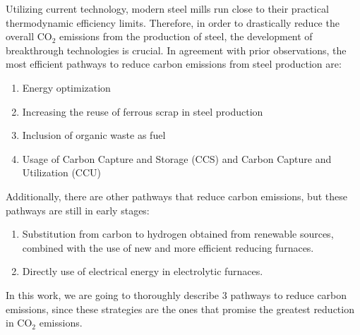 Utilizing current technology, modern steel mills run close to their practical thermodynamic efficiency limits. Therefore, in order to drastically reduce the overall CO$_2$ emissions from the production of steel, the development of breakthrough technologies is crucial.\autocite{rissman2020technologies} In agreement with prior observations,\autocite{aus_2022} the most efficient pathways to reduce carbon emissions from steel production are: 

\begin{enumerate}
\item Energy optimization
\item Increasing the reuse of ferrous scrap in steel production 
\item Inclusion of organic waste as fuel
\item Usage of Carbon Capture and Storage (CCS) and Carbon Capture and Utilization (CCU) 
\end{enumerate}

Additionally, there are other pathways that reduce carbon emissions, but these pathways are still in early stages:

\begin{enumerate}
\item Substitution from carbon to hydrogen obtained from renewable sources, combined with the use of new and more efficient reducing furnaces.
\item Directly use of electrical energy in electrolytic furnaces.
\end{enumerate}

In this work, we are going to thoroughly describe 3 pathways to reduce carbon emissions, since these strategies are the ones that promise the greatest reduction in CO$_2$ emissions.\autocite{elkerbout2021impact}

